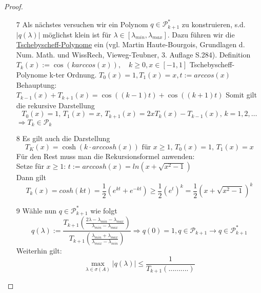 \begin{proof}
\begin{enumerate}[(1)]
    \item[7] Als nächstes versuchen wir ein Polynom $q\in \mathcal{P}^*_{k+1}$ zu konstruieren, s.d. $|q(\lambda)|$ möglichst klein ist für $\lambda\in [\lambda_{min}, \lambda_{max}]$. Dazu führen wir die \underline{Tschebyscheff-Polynome} ein (vgl. Martin Haute-Bourgois, Grundlagen d. Num. Math. und WissRech, Vieweg-Teubner, 3. Auflage S.284). 
      Definition  $T_k(x) := \cos(k arccos(x)), \quad k\geq 0, x\in [-1,1]$ Tschebyscheff-Polynome k-ter Ordnung.
  $T_0(x)=1, T_1(x)=x, t:=arccos(x)$
  Behauptung: $T_{k-1}(x) + T_{k+1}(x) = \cos((k-1)t) + \cos ((k+1)t)$
  Somit gilt die rekursive Darstellung
  \[ T_0(x)=1,\, T_1(x)=x,\, T_{k+1}(x)=2xT_k (x) - T_{k-1}(x),\, k=1,2,\dots \]
  $ \Rightarrow T_k \in \mathcal{P}_k$ \\

\item[8] Es gilt auch die Darstellung
  \[ T_K (x) =\cosh (k\cdot arccosh (x))\text{ für } x \geq 1,\, T_0(x)=1,\, T_1(x)=x \]
  Für den Rest muss man die Rekursionsformel anwenden:\\
  Setze für $x \geq 1$: $t:=arccosh(x) = ln (x+\sqrt{x^2-1})$\\
  Dann gilt
  \[ T_k(x) = cosh (kt) = \frac{1}{2} (e^{kt} + e^{-kt})\geq \frac{1}{2} (e^t)^k = \frac{1}{2} (x+\sqrt{x^2-1})^k \]

\item[9] Wähle nun $q \in \mathcal{P}^*_{k+1}$ wie folgt
  \[ q(\lambda) := \frac{T_{k+1}\left( \frac{2\lambda - \lambda_{min} - \lambda_{max}}{\lambda_{min}-\lambda_{max}} \right) }{T_{k+1} \left( \frac{\lambda_{min}+\lambda_{max}}{\lambda_{max} - \lambda_{min}}\right)} \Rightarrow q(0)=1, q\in\mathcal{P}_{k+1} \rightarrow q\in\mathcal{P}^*_{k+1} 
  \]
  Weiterhin gilt: 
  \[\max_{\lambda \in \sigma (A)} |q(\lambda)| \leq \frac{1}{T_{k+1}\left( .......... \right)} \]


  \end{enumerate}
\end{proof}


